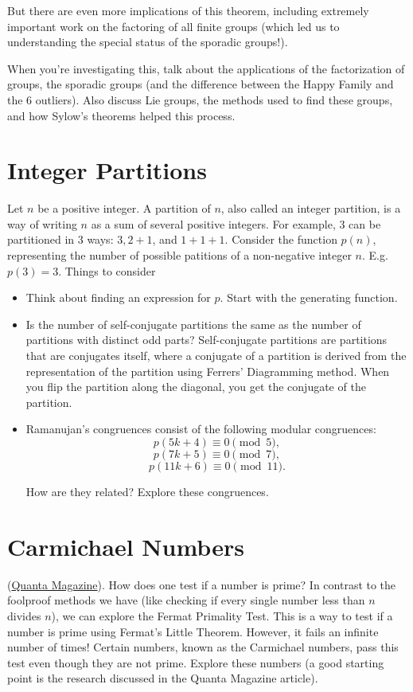 \documentclass{article}
\begin{document}
    But there are even more implications of this theorem, including extremely important work on the factoring of all finite groups (which led us to understanding the special status of the sporadic groups!).

    When you're investigating this, talk about the applications of the factorization of groups, the sporadic groups (and the difference between the Happy Family and the 6 outliers).
    Also discuss Lie groups, the methods used to find these groups, and how Sylow's theorems helped this process.
        
\section{Integer Partitions}

    Let $n$ be a positive integer. A partition of $n$, also called an integer partition, is a way of writing $n$ as a sum of several positive integers. For example, $3$ can be partitioned in 3 ways: $3, 2 + 1$, and $1 + 1 + 1.$ Consider the function $p(n)$, representing the number of possible patitions of a non-negative integer $n$. E.g. $p(3) = 3.$ Things to consider
    \begin{itemize}
        \item Think about finding an expression for $p$. Start with the generating function.
        \item Is the number of self-conjugate partitions the same as the number of partitions with distinct odd parts? Self-conjugate partitions are partitions that are conjugates itself, where a conjugate of a partition is derived from the representation of the partition using Ferrers' Diagramming method. When you flip the partition along the diagonal, you get the conjugate of the partition.
        \item Ramanujan's congruences consist of the following modular congruences:
        $$p(5k + 4) \equiv 0 \pmod{5},$$
        $$p(7k + 5) \equiv 0\pmod{7},$$
        $$p(11k + 6) \equiv 0 \pmod{11}.$$

        How are they related? Explore these congruences.
    \end{itemize}
        
\section{ Carmichael Numbers} (\hyperlink{https://www.quantamagazine.org/teenager-solves-stubborn-riddle-about-prime-number-look-alikes-20221013/}{Quanta Magazine}). How does one test if a number is prime? In contrast to the foolproof methods we have (like checking if every single number less than $n$ divides $n$), we can explore the Fermat Primality Test. This is a way to test if a number is prime using Fermat's Little Theorem. However, it fails an infinite number of times! Certain numbers, known as the Carmichael numbers, pass this test even though they are not prime. Explore these numbers (a good starting point is the research discussed in the Quanta Magazine article).
        
\end{document}
